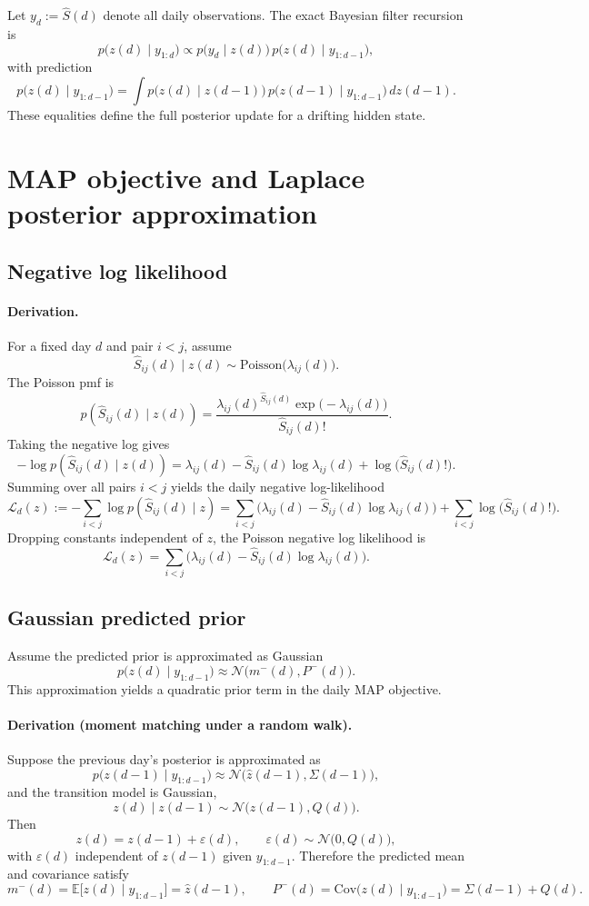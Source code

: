 \documentclass[11pt]{article}
\begin{document}
Let $y_d:=\widehat S(d)$ denote all daily observations.
The exact Bayesian filter recursion is
\[
p\big(z(d)\mid y_{1:d}\big)
\propto
p\big(y_d\mid z(d)\big)\,p\big(z(d)\mid y_{1:d-1}\big),
\]
with prediction
\[
p\big(z(d)\mid y_{1:d-1}\big)
=
\int p\big(z(d)\mid z(d-1)\big)\,p\big(z(d-1)\mid y_{1:d-1}\big)\,dz(d-1).
\]
These equalities define the full posterior update for a drifting hidden state.

\section{MAP objective and Laplace posterior approximation}

\subsection{Negative log likelihood}
\paragraph{Derivation.}
For a fixed day $d$ and pair $i<j$, assume
\[
\widehat S_{ij}(d)\mid z(d)\sim \mathrm{Poisson}\!\big(\lambda_{ij}(d)\big).
\]
The Poisson pmf is
\[
p\!\left(\widehat S_{ij}(d)\mid z(d)\right)
=
\frac{\lambda_{ij}(d)^{\widehat S_{ij}(d)}\exp\!\big(-\lambda_{ij}(d)\big)}{\widehat S_{ij}(d)!}.
\]
Taking the negative log gives
\[
-\log p\!\left(\widehat S_{ij}(d)\mid z(d)\right)
=
\lambda_{ij}(d)-\widehat S_{ij}(d)\log \lambda_{ij}(d)+\log\!\big(\widehat S_{ij}(d)!\big).
\]
Summing over all pairs $i<j$ yields the daily negative log-likelihood
\[
\mathcal L_d(z)
:=
-\sum_{i<j}\log p\!\left(\widehat S_{ij}(d)\mid z\right)
=
\sum_{i<j}\Big(\lambda_{ij}(d)-\widehat S_{ij}(d)\log \lambda_{ij}(d)\Big)
+\sum_{i<j}\log\!\big(\widehat S_{ij}(d)!\big).
\]
Dropping constants independent of $z$, the Poisson negative log likelihood is
\[
\mathcal L_d(z)
=
\sum_{i<j}\Big(\lambda_{ij}(d) - \widehat S_{ij}(d)\log \lambda_{ij}(d)\Big).
\]

\subsection{Gaussian predicted prior}
Assume the predicted prior is approximated as Gaussian
\[
p\big(z(d)\mid y_{1:d-1}\big)\approx \mathcal N\!\big(m^-(d),P^-(d)\big).
\]
This approximation yields a quadratic prior term in the daily MAP objective.

\paragraph{Derivation (moment matching under a random walk).}
Suppose the previous day's posterior is approximated as
\[
p\big(z(d-1)\mid y_{1:d-1}\big)\approx \mathcal N\!\big(\widehat z(d-1),\Sigma(d-1)\big),
\]
and the transition model is Gaussian,
\[
z(d)\mid z(d-1)\sim \mathcal N\!\big(z(d-1),Q(d)\big).
\]
Then
\[
z(d)=z(d-1)+\varepsilon(d),\qquad \varepsilon(d)\sim \mathcal N\!\big(0,Q(d)\big),
\]
with $\varepsilon(d)$ independent of $z(d-1)$ given $y_{1:d-1}$. Therefore the predicted mean and covariance satisfy
\[
m^-(d)=\mathbb E\!\big[z(d)\mid y_{1:d-1}\big]=\widehat z(d-1),
\qquad
P^-(d)=\mathrm{Cov}\!\big(z(d)\mid y_{1:d-1}\big)=\Sigma(d-1)+Q(d).
\]
\end{document}
